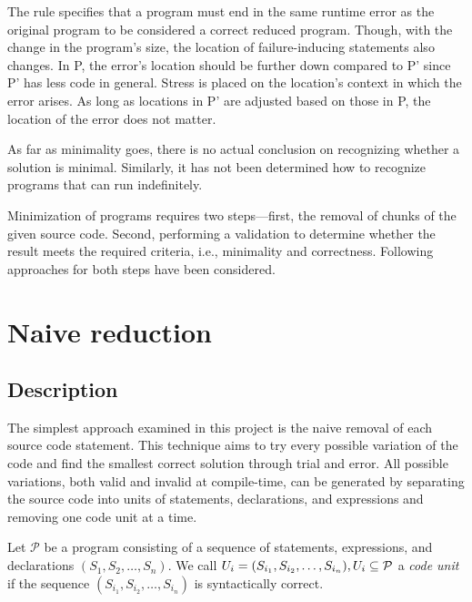 The rule specifies that a program must end in the same runtime error 
as the original program to be considered a correct reduced program.
Though, with the change in the program's size, the location 
of failure-inducing statements also changes.
In P, the error's location should be further down compared to 
P' since P' has less code in general.
Stress is placed on the location's context in which the error arises.
As long as locations in P' are adjusted based on those in P, the 
location of the error does not matter.


As far as minimality goes, there is no actual conclusion on recognizing 
whether a solution is minimal.
Similarly, it has not been determined how to recognize programs that can 
run indefinitely.

Minimization of programs requires two steps—first, the removal of chunks 
of the given source code.
Second, performing a validation to determine whether the result meets 
the required criteria, i.e., minimality and correctness.
Following approaches for both steps have been considered.

\section{Naive reduction}

\subsection{Description}

The simplest approach examined in this project is the naive removal of each 
source code statement.
This technique aims to try every possible variation of the code and find 
the smallest correct solution through trial and error.
All possible variations, both valid and invalid at compile-time, can be 
generated by separating the source code into units of statements, 
declarations, and expressions and removing one code unit at a time.

\begin{defn}\label{def04:3}
  Let $\mathcal{P}$ be a program consisting of a sequence of statements, 
  expressions, and declarations $(S_1, S_2, \ldots, S_n)$. 
  We call $U_i = (S_{i_1},\-S_{i_2},\-\ldots,\-S_{i_n}), 
  U_i \subseteq \mathcal{P}$ a \emph{code unit} if the sequence 
  $(S_{i_1}, S_{i_2}, \ldots, S_{i_n})$ is syntactically
  correct.
\end{defn}

